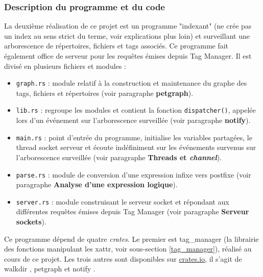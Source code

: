 \subsubsection{Description du programme et du code}
La deuxième réalisation de ce projet est un programme "indexant" (ne crée pas un index au sens 
strict du terme, voir explications plus loin) et surveillant une arborescence de 
répertoires, fichiers et tags associés. Ce programme fait également office de serveur pour les 
requêtes émises depuis Tag Manager. Il est divisé en plusieurs fichiers et modules :
\begin{itemize}
    \item \texttt{graph.rs} : module relatif à la construction et 
        maintenance du graphe des tags, fichiers et répertoires (voir paragraphe \textbf{petgraph}).
    \item \texttt{lib.rs} : regroupe les modules et contient la fonction 
        \texttt{dispatcher()}, appelée lors d'un événement sur l'arborescence surveillée 
        (voir paragraphe \textbf{notify}).
    \item \texttt{main.rs} : point d'entrée du programme, initialise les variables 
        partagées, le thread socket serveur et écoute indéfiniment sur les événements survenus 
        sur l'arborescence surveillée (voir paragraphe \textbf{Threads et \textit{channel}}).
    \item \texttt{parse.rs} : module de conversion d'une expression infixe vers postfixe 
        (voir paragraphe \textbf{Analyse d'une expression logique}).
    \item \texttt{server.rs} : module construisant le serveur socket et répondant 
        aux différentes requêtes émises depuis Tag Manager (voir paragraphe \textbf{Serveur sockets}).
\end{itemize}
Ce programme dépend de quatre \textit{crates}. Le premier est 
tag\_manager (la librairie des fonctions manipulant les \acrshort{xattr}, voir sous-section \ref{tag_manager}), 
réalisé au cours de ce projet. Les trois autres sont disponibles sur \href{https://crates.io}{crates.io}, 
il s'agit de walkdir \cite{ref43}, petgraph \cite{ref44} et notify \cite{ref45}.


